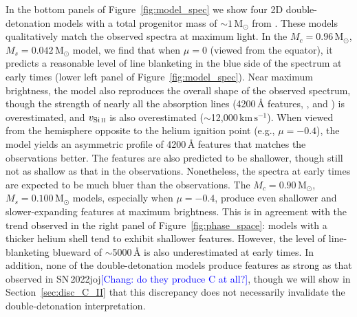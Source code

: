 \documentclass[twocolumn]{aastex631}
\newcommand{\sn}{SN\,2022joj}
\newcommand{\kms}{$\mathrm{km}\,\mathrm{s}^{-1}$}
\newcommand{\chang}[1]{\textcolor{blue}{[Chang: #1]}}
\begin{document}
\begin{CJK*}{UTF8}{gbsn}
In the bottom panels of Figure~\ref{fig:model_spec} we show four 2D double-detonation models with a total progenitor mass of $\sim$$1\,\mathrm{M_\odot}$ from \citet{Shen_2D_2021}. These models qualitatively match the observed spectra at maximum light. In the $M_c=0.96\,\mathrm{M_\odot}$, $M_s=0.042\,\mathrm{M_\odot}$ model, we find that when $\mu=0$ (viewed from the equator), it predicts a reasonable level of line blanketing in the blue side of the spectrum at early times (lower left panel of Figure~\ref{fig:model_spec}). Near maximum brightness, the model also reproduces the overall shape of the observed spectrum, though the strength of nearly all the absorption lines (4200\,\r{A} features, , and ) is overestimated, and $v_\mathrm{Si\,\textsc{ii}}$ is also overestimated ($\sim$12,000\,\kms). When viewed from the hemisphere opposite to the helium ignition point (e.g., $\mu=-0.4$), the model yields an asymmetric profile of 4200\,\r{A} features that matches the observations better. The  features are also predicted to be shallower, though still not as shallow as that in the observations. Nonetheless, the spectra at early times are expected to be much bluer than the observations. The $M_c=0.90\,\mathrm{M_\odot}$, $M_s=0.100\,\mathrm{M_\odot}$ models, especially when $\mu=-0.4$, produce even shallower and slower-expanding  features at maximum brightness. This is in agreement with the trend observed in the right panel of Figure~\ref{fig:phase_space}: models with a thicker helium shell tend to exhibit shallower  features. However, the level of line-blanketing blueward of $\sim$5000\,\r{A} is also underestimated at early times. In addition, none of the double-detonation models produce  features as strong as that observed in \sn \chang{do they produce C at all?}, though we will show in Section~\ref{sec:disc_C_II} that this discrepancy does not necessarily invalidate the double-detonation interpretation.


\end{CJK*}
\end{document}
